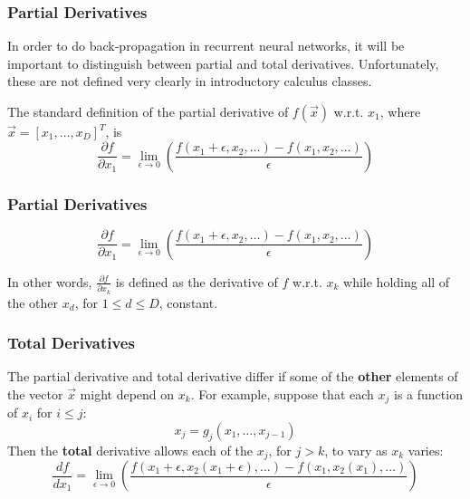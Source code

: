 \documentclass{beamer}
\begin{document}
\begin{frame}
  \frametitle{Partial Derivatives}

  In order to do back-propagation in recurrent neural networks, it
  will be important to distinguish between partial and total
  derivatives.  Unfortunately, these are not defined very clearly in
  introductory calculus classes.

  The standard definition of the partial derivative of $f(\vec{x})$
  w.r.t. $x_1$, where $\vec{x}=[x_1,\ldots,x_D]^T$, is
  \begin{displaymath}
    \frac{\partial f}{\partial x_1} = \lim_{\epsilon\rightarrow 0}\left(
    \frac{f(x_1+\epsilon,x_{2},\ldots)-f(x_1,x_{2},\ldots)}
         {\epsilon}\right)
  \end{displaymath}
\end{frame}
  
\begin{frame}
  \frametitle{Partial Derivatives}

  \begin{displaymath}
    \frac{\partial f}{\partial x_1} = \lim_{\epsilon\rightarrow 0}\left(
    \frac{f(x_1+\epsilon,x_{2},\ldots)-f(x_1,x_{2},\ldots)}
         {\epsilon}\right)
  \end{displaymath}

  In other words, $\frac{\partial f}{\partial x_k}$ is defined as the
  derivative of $f$ w.r.t. $x_k$ while holding all of the other $x_d$,
  for $1\le d\le D$, constant.
\end{frame}
\begin{frame}
  \frametitle{Total Derivatives}

  The partial derivative and total derivative differ if some of the
  {\bf other} elements of the vector $\vec{x}$ might depend on $x_k$.
  For example, suppose that each $x_j$ is a function of $x_i$ for $i\le j$:
  \begin{displaymath}
    x_j = g_j(x_1,\ldots,x_{j-1})
  \end{displaymath}
  Then the {\bf total} derivative allows each of the $x_j$, for $j>k$,
  to vary as $x_k$ varies:
  \begin{displaymath}
    \frac{d f}{d x_1} = \lim_{\epsilon\rightarrow 0}\left(
    \frac{f(x_1+\epsilon,x_{2}(x_1+\epsilon),\ldots)-
      f(x_1,x_{2}(x_1),\ldots)}{\epsilon}
    \right)
  \end{displaymath}
\end{frame}
  
\end{document}
